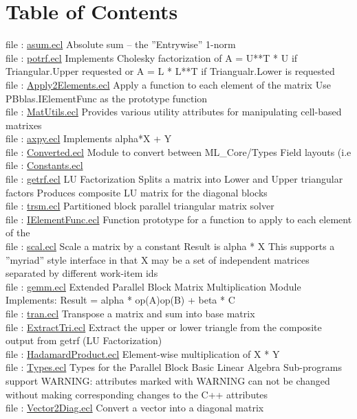 \section*{Table of Contents}
file : \hyperlink{ecldoc:toc:PBblas.asum}{asum.ecl}  Absolute sum -- the ''Entrywise'' 1-norm \\
file : \hyperlink{ecldoc:toc:PBblas.potrf}{potrf.ecl}  Implements Cholesky factorization of A = U**T * U if Triangular.Upper requested or A = L * L**T if Triangualr.Lower is requested \\
file : \hyperlink{ecldoc:toc:PBblas.Apply2Elements}{Apply2Elements.ecl}  Apply a function to each element of the matrix Use PBblas.IElementFunc as the prototype function \\
file : \hyperlink{ecldoc:toc:PBblas.MatUtils}{MatUtils.ecl}  Provides various utility attributes for manipulating cell-based matrixes \\
file : \hyperlink{ecldoc:toc:PBblas.axpy}{axpy.ecl}  Implements alpha*X + Y \\
file : \hyperlink{ecldoc:toc:PBblas.Converted}{Converted.ecl}  Module to convert between ML\_Core/Types Field layouts (i.e \\
file : \hyperlink{ecldoc:toc:PBblas.Constants}{Constants.ecl}   \\
file : \hyperlink{ecldoc:toc:PBblas.getrf}{getrf.ecl}  LU Factorization Splits a matrix into Lower and Upper triangular factors Produces composite LU matrix for the diagonal blocks \\
file : \hyperlink{ecldoc:toc:PBblas.trsm}{trsm.ecl}  Partitioned block parallel triangular matrix solver \\
file : \hyperlink{ecldoc:toc:PBblas.IElementFunc}{IElementFunc.ecl}  Function prototype for a function to apply to each element of the \\
file : \hyperlink{ecldoc:toc:PBblas.scal}{scal.ecl}  Scale a matrix by a constant Result is alpha * X This supports a ''myriad'' style interface in that X may be a set of independent matrices separated by different work-item ids \\
file : \hyperlink{ecldoc:toc:PBblas.gemm}{gemm.ecl}  Extended Parallel Block Matrix Multiplication Module Implements: Result = alpha * op(A)op(B) + beta * C \\
file : \hyperlink{ecldoc:toc:PBblas.tran}{tran.ecl}  Transpose a matrix and sum into base matrix \\
file : \hyperlink{ecldoc:toc:PBblas.ExtractTri}{ExtractTri.ecl}  Extract the upper or lower triangle from the composite output from getrf (LU Factorization) \\
file : \hyperlink{ecldoc:toc:PBblas.HadamardProduct}{HadamardProduct.ecl}  Element-wise multiplication of X * Y \\
file : \hyperlink{ecldoc:toc:PBblas.Types}{Types.ecl}  Types for the Parallel Block Basic Linear Algebra Sub-programs support WARNING: attributes marked with WARNING can not be changed without making corresponding changes to the C++ attributes \\
file : \hyperlink{ecldoc:toc:PBblas.Vector2Diag}{Vector2Diag.ecl}  Convert a vector into a diagonal matrix \\

